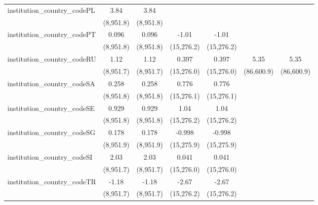 \begin{tabular}{lcccccc}
   institution\_country\_codePL          & 3.84          & 3.84          &               &               &              &   \\   
                                         & (8,951.8)     & (8,951.8)     &               &               &              &   \\   
   institution\_country\_codePT          & 0.096         & 0.096         & -1.01         & -1.01         &              &   \\   
                                         & (8,951.8)     & (8,951.8)     & (15,276.2)    & (15,276.2)    &              &   \\   
   institution\_country\_codeRU          & 1.12          & 1.12          & 0.397         & 0.397         & 5.35         & 5.35\\   
                                         & (8,951.7)     & (8,951.7)     & (15,276.0)    & (15,276.0)    & (86,600.9)   & (86,600.9)\\   
   institution\_country\_codeSA          & 0.258         & 0.258         & 0.776         & 0.776         &              &   \\   
                                         & (8,951.8)     & (8,951.8)     & (15,276.1)    & (15,276.1)    &              &   \\   
   institution\_country\_codeSE          & 0.929         & 0.929         & 1.04          & 1.04          &              &   \\   
                                         & (8,951.8)     & (8,951.8)     & (15,276.2)    & (15,276.2)    &              &   \\   
   institution\_country\_codeSG          & 0.178         & 0.178         & -0.998        & -0.998        &              &   \\   
                                         & (8,951.9)     & (8,951.9)     & (15,275.9)    & (15,275.9)    &              &   \\   
   institution\_country\_codeSI          & 2.03          & 2.03          & 0.041         & 0.041         &              &   \\   
                                         & (8,951.7)     & (8,951.7)     & (15,276.0)    & (15,276.0)    &              &   \\   
   institution\_country\_codeTR          & -1.18         & -1.18         & -2.67         & -2.67         &              &   \\   
                                         & (8,951.7)     & (8,951.7)     & (15,276.2)    & (15,276.2)    &              &   \\   

\end{tabular}

